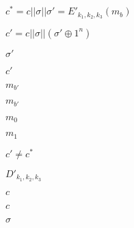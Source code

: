 \documentclass[10pt]{book}
\begin{document}
\begin{mdSnippets}
\begin{mdInlineSnippet}[f8a7c465f4a573a2e6673761a908527f]%
$c^* = c|| \sigma || \sigma' = E'_{k_1,k_2,k_3}(m_b)$\end{mdInlineSnippet}%
\begin{mdInlineSnippet}[ff77f240c0866b6ce21286d860647205]%
$c' = c || \sigma || (\sigma' \oplus 1^n)$\end{mdInlineSnippet}%
\begin{mdInlineSnippet}[88207bc086c9d879c22807479d29a9e2]%
$\sigma'$\end{mdInlineSnippet}%
\begin{mdInlineSnippet}[12c7acffa10294560a339fa9f4796b80]%
$c'$\end{mdInlineSnippet}%
\begin{mdInlineSnippet}[8a5f9350a399fb01c63d06ace762e1d5]%
$m_{b'}$\end{mdInlineSnippet}%
\begin{mdInlineSnippet}[8a5f9350a399fb01c63d06ace762e1d5]%
$m_{b'}$\end{mdInlineSnippet}%
\begin{mdInlineSnippet}[fed1e4775925bd3f7af0c5d8fc47e4e6]%
$m_0$\end{mdInlineSnippet}%
\begin{mdInlineSnippet}%
$m_1$\end{mdInlineSnippet}%
\begin{mdInlineSnippet}[524330cee1943c719d608d0905e402f6]%
$c' \neq c^*$\end{mdInlineSnippet}%
\begin{mdInlineSnippet}[ca4c61ee2718280f5b1991aa6ec1c5cd]%
$D'_{k_1, k_2, k_3}$\end{mdInlineSnippet}%
\begin{mdInlineSnippet}[4a8a08f09d37b73795649038408b5f33]%
$c$\end{mdInlineSnippet}%
\begin{mdInlineSnippet}[4a8a08f09d37b73795649038408b5f33]%
$c$\end{mdInlineSnippet}%
\begin{mdInlineSnippet}[a2ab7d71a0f07f388ff823293c147d21]%
$\sigma$\end{mdInlineSnippet}%

\end{mdSnippets}
\end{document}
